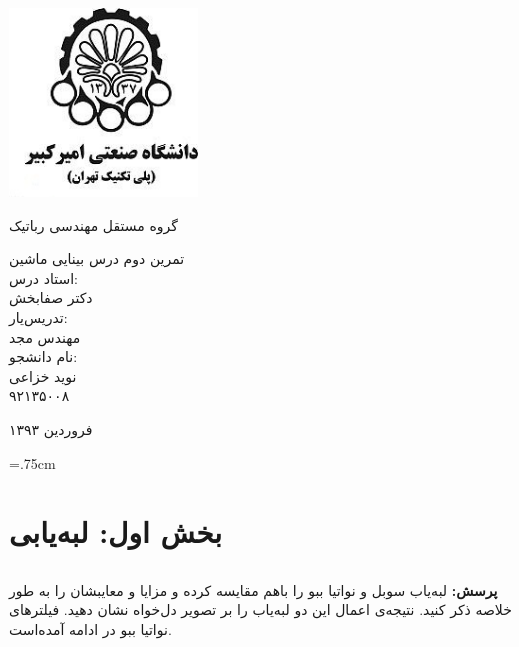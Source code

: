 \documentclass[12pt,a4paper]{article}
\theoremstyle{definition}
\theoremstyle{theorem}
\theoremstyle{definition}
\begin{document}
\thispagestyle{empty}
\vspace*{-28mm}
\centerline{\includegraphics[height=5cm]{logo.jpg}}
\begin{center}
\vspace{-2mm}
{\large \titr
گروه مستقل مهندسی رباتیک
\\[2.1cm]
}

{\Large \titr
تمرین دوم درس بینایی ماشین
\\[2cm]
استاد درس:
\\[.5cm]
دکتر صفابخش
\\[1.5cm]
\large 
تدریس‌یار: 
\\[0.5cm]
مهندس مجد
\\[1.5cm]
نام دانشجو:
\\[.5cm]
نوید خزاعی
\\[.5cm]
۹۲۱۳۵۰۰۸
\\[1.5cm]
}
\baselineskip=1cm

{\large
فروردین ۱۳۹۳
}
\end{center}
\newpage
\baselineskip=1cm
\tableofcontents

\baselineskip=.75cm
\newpage 
\section{بخش اول: لبه‌یابی}
\vspace{0.5cm}
\subsection{{
}
}



\textbf{پرسش: }
لبه‌یاب سوبل و نواتیا ببو را باهم مقایسه کرده و مزایا و معایبشان را به طور خلاصه ذکر کنید. نتیجه‌ی اعمال این دو لبه‌یاب را بر تصویر دل‌خواه نشان دهید. فیلترهای نواتیا ببو در ادامه آمده‌است.
\end{document}
